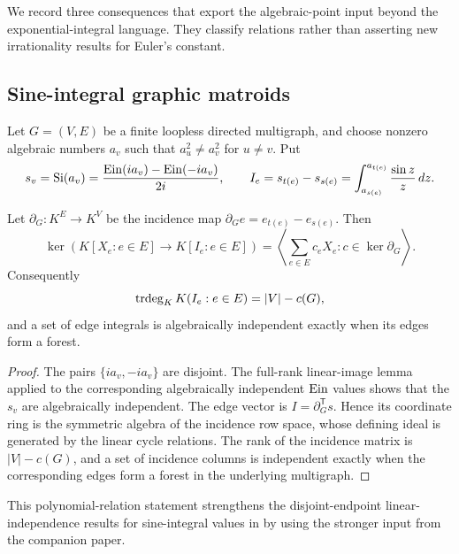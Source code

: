 We record three consequences that export the algebraic-point input beyond
the exponential-integral language.  They classify relations rather than
asserting new irrationality results for Euler's constant.

\subsection*{Sine-integral graphic matroids}

Let \(G=(V,E)\) be a finite loopless directed multigraph, and choose nonzero algebraic numbers
\(a_v\) such that \(a_u^2\ne a_v^2\) for \(u\ne v\).  Put
\[
 s_v=\operatorname{Si}(a_v)
 =\frac{\operatorname{Ein}(ia_v)-\operatorname{Ein}(-ia_v)}{2i},
 \qquad
 I_e=s_{t(e)}-s_{s(e)}
 =\int_{a_{s(e)}}^{a_{t(e)}}\frac{\sin z}{z}\,dz.
\]

\begin{theorem}
\label{thm:sine-graphic-ideal}
Let \(\partial_G:K^E\to K^V\) be the incidence map
\(\partial_Ge=e_{t(e)}-e_{s(e)}\).  Then
\begin{equation}\label{eq:sine-graphic-ideal}
 \boxed{\displaystyle
 \ker\!\left(K[X_e:e\in E]\longrightarrow K[I_e:e\in E]\right)
 =
 \left\langle\sum_{e\in E}c_eX_e:
 c\in\ker\partial_G\right\rangle.}
\end{equation}
Consequently
\begin{equation}\label{eq:sine-graphic-trdeg}
 \operatorname{trdeg}_KK(I_e:e\in E)=|V|-c(G),
\end{equation}
and a set of edge integrals is algebraically independent exactly when its
edges form a forest.
\end{theorem}

\begin{proof}
The pairs \(\{ia_v,-ia_v\}\) are disjoint.  The full-rank linear-image
lemma applied to the corresponding algebraically independent \(\operatorname{Ein}\)
values shows that the \(s_v\) are algebraically independent.  The edge
vector is \(I=\partial_G^{\mathsf T}s\).  Hence its coordinate ring is
the symmetric algebra of the incidence row space, whose defining ideal is
generated by the linear cycle relations.  The rank of the incidence matrix
is \(|V|-c(G)\), and a set of incidence columns is independent exactly when
the corresponding edges form a forest in the underlying multigraph.
\end{proof}

This polynomial-relation statement strengthens the disjoint-endpoint
linear-independence results for sine-integral values in
\cite{Delaygue2022} by using the stronger input from the companion paper.

